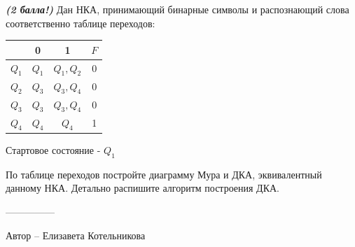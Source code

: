 \question
\textbf{\textit{(2 балла!)}} Дан НКА, принимающий бинарные символы и распознающий слова соответственно таблице переходов:

\begin{tabular}{||c | c c c||} 
 \hline
 & 0 & 1 & $F$ \\ 
 \hline\hline
 $Q_1$ & $Q_1$ & $Q_1, Q_2$ & 0 \\ 
 \hline
 $Q_2$ &  $Q_3$ & $Q_3, Q_4$ & 0 \\
 \hline
 $Q_3$ &  $Q_3$ & $Q_3, Q_4$ & 0 \\
 \hline
 $Q_4$ & $Q_4$ & $Q_4$ & 1 \\
 \hline
\end{tabular}

Стартовое состояние - $Q_1$

По таблице переходов постройте диаграмму Мура и ДКА, эквивалентный данному НКА. Детально распишите алгоритм построения ДКА.

---------------

Автор -- Елизавета Котельникова
